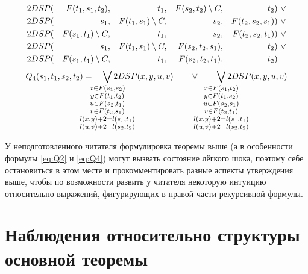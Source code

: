 \begin{theorem}
\begin{enumerate}
\begin{align}
    2DSP(&& F(t_1, s_1, t_2) ,&& t_1              ,&& F(s_2, t_2) \setminus C,&& t_2              &)~\vee \\
    2DSP(&& s_1              ,&& F(t_1, s_1) \setminus C,&& s_2              ,&& F(t_2, s_2, s_1) &)~\vee \\
    2DSP(&& F(s_1, t_1) \setminus C,&& t_1              ,&& s_2              ,&& F(t_2, s_2, t_1) &)~\vee \\
    2DSP(&& s_1              ,&& F(t_1, s_1) \setminus C,&& F(s_2, t_2, s_1) ,&& t_2              &)~\vee \\
    2DSP(&& F(s_1, t_1) \setminus C,&& t_1              ,&& F(s_2, t_2, t_1) ,&& t_2              &) \label{eq:Q2}
\end{align}
\begin{align}
    Q_4(s_1, t_1, s_2, t_2) = \quad
        \smashoperator{\bigvee_{
        \large \substack{
            x \in F(s_1, s_2)\\ 
            y \in F(t_1, t_2)\\ 
            u \in F(s_2, t_1)\\ 
            v \in F(t_2, s_1)\\ 
            l(x, y) + 2 = l(s_1, t_1)\\ 
            l(u, v) + 2 = l(s_2, t_2)
        }
        }} 2DSP(x, y, u, v)
        \quad\quad\vee\quad\quad
        \smashoperator{\bigvee_{
        \large \substack{
            x \in F(s_1, t_2)\\ 
            y \in F(t_1, s_2)\\ 
            u \in F(s_2, s_1)\\ 
            v \in F(t_2, t_1)\\ 
            l(x, y) + 2 = l(s_1, t_1)\\ 
            l(u, v) + 2 = l(s_2, t_2)
        }
        }} 2DSP(x, y, u, v) \label{eq:Q4} \\
\end{align}
\end{enumerate}
\end{theorem}

У неподготовленного читателя формулировка теоремы выше (а в особенности формулы \eqref{eq:Q2} и \eqref{eq:Q4}) могут вызвать состояние лёгкого шока, поэтому себе остановиться в этом месте и прокомментировать разные аспекты утверждения выше, чтобы по возможности развить у читателя некоторую интуицию относительно выражений, фигурирующих в правой части рекурсивной формулы.

\chapter{Наблюдения относительно структуры основной теоремы}

